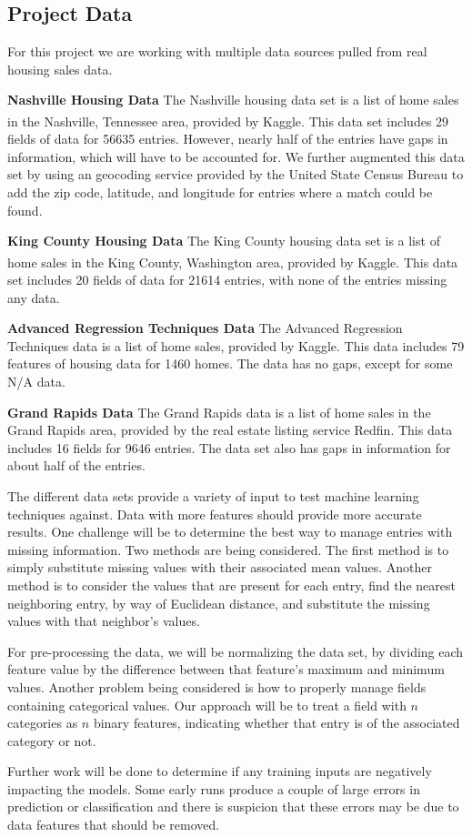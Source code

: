 \documentclass[10pt]{article}
\begin{document}
\begin{multicols}{2}
		\section{Project Data}
		For this project we are working with multiple data sources pulled from real housing sales data.
		\par
		\textbf{Nashville Housing Data} The Nashville housing data set is a list of home sales in the Nashville, Tennessee area, provided by Kaggle\textsuperscript{\cite{nashville_data}}. This data set includes 29 fields of data for 56635 entries. However, nearly half of the entries have gaps in information, which will have to be accounted for. We further augmented this data set by using an geocoding service provided by the United State Census Bureau to add the zip code, latitude, and longitude for entries where a match could be found.
		\par
		\textbf{King County Housing Data} The King County housing data set is a list of home sales in the King County, Washington area, provided by Kaggle\textsuperscript{\cite{kc_data}}. This data set includes 20 fields of data for 21614 entries, with none of the entries missing any data.
		\par
		\textbf{Advanced Regression Techniques Data} The Advanced Regression Techniques data is a list of home sales, provided by Kaggle. This data includes 79 features of housing data for 1460 homes. The data has no gaps, except for some N/A data.
		\par
		\textbf{Grand Rapids Data} The Grand Rapids data is a list of home sales in the Grand Rapids area, provided by the real estate listing service Redfin. This data includes 16 fields for 9646 entries. The data set also has gaps in information for about half of the entries.
		\par
		The different data sets provide a variety of input to test machine learning techniques against. Data with more features should provide more accurate results. One challenge will be to determine the best way to manage entries with missing information. Two methods are being considered. The first method is to simply substitute missing values with their associated mean values. Another method is to consider the values that are present for each entry, find the nearest neighboring entry, by way of Euclidean distance, and substitute the missing values with that neighbor's values.
		\par
		For pre-processing the data, we will be normalizing the data set, by dividing each feature value by the difference between that feature's maximum and minimum values. Another problem being considered is how to properly manage fields containing categorical values. Our approach will be to treat a field with \(n\) categories as \(n\) binary features, indicating whether that entry is of the associated category or not.
		\par
                Further work will be done to determine if any training inputs are negatively impacting the models. Some early runs produce a couple of large errors in prediction or classification and there is suspicion that these errors may be due to data features that should be removed.

\end{multicols}
\end{document}
